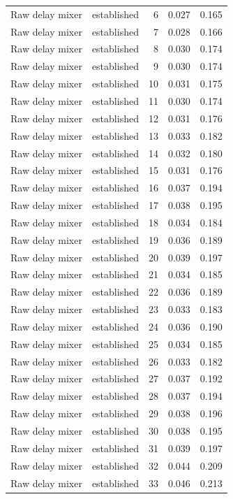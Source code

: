 \begin{tabular}{llrrr}
Raw delay mixer & established & 6 & 0.027 & 0.165 \\
Raw delay mixer & established & 7 & 0.028 & 0.166 \\
Raw delay mixer & established & 8 & 0.030 & 0.174 \\
Raw delay mixer & established & 9 & 0.030 & 0.174 \\
Raw delay mixer & established & 10 & 0.031 & 0.175 \\
Raw delay mixer & established & 11 & 0.030 & 0.174 \\
Raw delay mixer & established & 12 & 0.031 & 0.176 \\
Raw delay mixer & established & 13 & 0.033 & 0.182 \\
Raw delay mixer & established & 14 & 0.032 & 0.180 \\
Raw delay mixer & established & 15 & 0.031 & 0.176 \\
Raw delay mixer & established & 16 & 0.037 & 0.194 \\
Raw delay mixer & established & 17 & 0.038 & 0.195 \\
Raw delay mixer & established & 18 & 0.034 & 0.184 \\
Raw delay mixer & established & 19 & 0.036 & 0.189 \\
Raw delay mixer & established & 20 & 0.039 & 0.197 \\
Raw delay mixer & established & 21 & 0.034 & 0.185 \\
Raw delay mixer & established & 22 & 0.036 & 0.189 \\
Raw delay mixer & established & 23 & 0.033 & 0.183 \\
Raw delay mixer & established & 24 & 0.036 & 0.190 \\
Raw delay mixer & established & 25 & 0.034 & 0.185 \\
Raw delay mixer & established & 26 & 0.033 & 0.182 \\
Raw delay mixer & established & 27 & 0.037 & 0.192 \\
Raw delay mixer & established & 28 & 0.037 & 0.194 \\
Raw delay mixer & established & 29 & 0.038 & 0.196 \\
Raw delay mixer & established & 30 & 0.038 & 0.195 \\
Raw delay mixer & established & 31 & 0.039 & 0.197 \\
Raw delay mixer & established & 32 & 0.044 & 0.209 \\
Raw delay mixer & established & 33 & 0.046 & 0.213 \\

\end{tabular}
